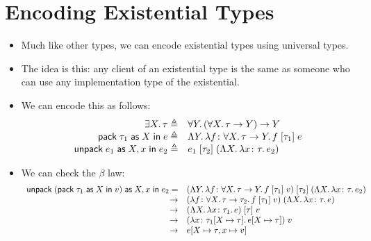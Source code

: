 \documentclass{lecturenotes}
\newcommand{\tabs}[3]{\ensuremath{\lambda #1 \colon #2.\,#3}}
\newcommand{\app}[2]{\ensuremath{#1\;#2}}
\newcommand{\fatype}[2]{\ensuremath{\forall #1.\,#2}}
\newcommand{\Abs}[2]{\Lambda #1.\,#2}
\newcommand{\App}[2]{#1\;[#2]}
\newcommand{\extype}[2]{\ensuremath{\exists #1.\,#2}}
\newcommand{\pack}[3]{\ensuremath{\textsf{pack}\mkern5mu#1\mathrel{\textsf{as}}#2\mathrel{\textsf{in}}#3}}
\newcommand{\unpack}[4]{\ensuremath{\textsf{unpack}\mkern5mu#1\mathrel{\textsf{as}} #2, #3 \mathrel{\textsf{in}} #4}}
\begin{document}
\section{Encoding Existential Types}
\label{sec:encod-exist-types}

\begin{itemize}
\item Much like other types, we can encode existential types using universal types.
\item The idea is this: any client of an existential type is the same as someone who can use any implementation type of the existential.
\item We can encode this as follows:
  $$
  \begin{array}{rl}
    \extype{X}{\tau} \triangleq& \fatype{Y}{(\fatype{X}{\tau} \to Y) \to Y}\\
    \pack{\tau_1}{X}{e} \triangleq& \Abs{Y}{\tabs{f}{\fatype{X}{\tau \to Y}}{\app{\App{f}{\tau_1}}{e}}}\\
    \unpack{e_1}{X}{x}{e_2} \triangleq& \app{\App{e_1}{\tau_2}}{(\Abs{X}{\tabs{x}{\tau}{e_2}})}
  \end{array}
  $$
\item We can check the $\beta$ law:
  $$
  \begin{array}{rl}
    \unpack{(\pack{\tau_1}{X}{v})}{X}{x}{e_2} =& \app{\App{(\Abs{Y}{\tabs{f}{\fatype{X}{\tau \to Y}}{\app{\App{f}{\tau_1}}{v}}})}{\tau_2}}{(\Abs{X}{\tabs{x}{\tau}{e_2}})}\\
    \to& \app{(\tabs{f}{\fatype{X}{\tau \to \tau_2}}{\app{\App{f}{\tau_1}}{v}})}{(\Abs{X}{\tabs{x}{\tau}{e}})}\\
    \to& \app{\App{(\Abs{X}{\tabs{x}{\tau_1}{e}})}{\tau}}{v}\\
    \to& \app{(\tabs{x}{\tau_1[X\mapsto\tau]}{e[X \mapsto \tau}])}{v}\\
    \to& e[X \mapsto \tau, x \mapsto v]
  \end{array}
  $$
\end{itemize}
\end{document}
